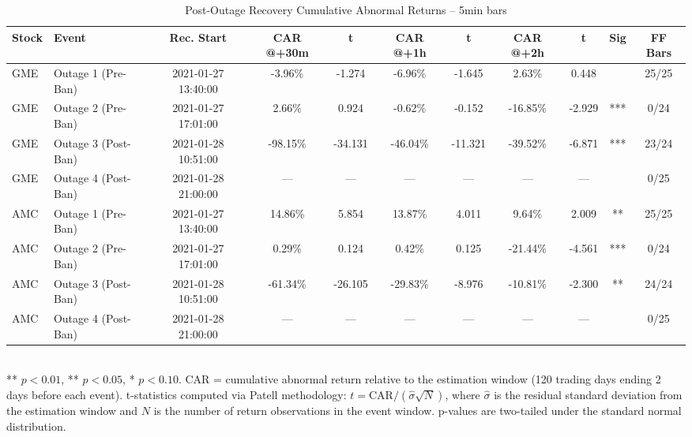 \begin{table}[htbp]
  \centering
  \caption{Post-Outage Recovery Cumulative Abnormal Returns -- 5min bars}
  \label{tab:recovery_5min}
  \begin{tabular}{llccccccccc}
    \hline\hline
    Stock & Event & Rec. Start & CAR @+30m & t & CAR @+1h & t & CAR @+2h & t & Sig & FF Bars \\
    \hline
    GME & Outage 1 (Pre-Ban) & 2021-01-27 13:40:00 & -3.96\% & -1.274 & -6.96\% & -1.645 & 2.63\% & 0.448 &  & 25/25 \\
    GME & Outage 2 (Pre-Ban) & 2021-01-27 17:01:00 & 2.66\% & 0.924 & -0.62\% & -0.152 & -16.85\% & -2.929 & *** & 0/24 \\
    GME & Outage 3 (Post-Ban) & 2021-01-28 10:51:00 & -98.15\% & -34.131 & -46.04\% & -11.321 & -39.52\% & -6.871 & *** & 23/24 \\
    GME & Outage 4 (Post-Ban) & 2021-01-28 21:00:00 & — & — & — & — & — & — &  & 0/25 \\
    \hline
    AMC & Outage 1 (Pre-Ban) & 2021-01-27 13:40:00 & 14.86\% & 5.854 & 13.87\% & 4.011 & 9.64\% & 2.009 & ** & 25/25 \\
    AMC & Outage 2 (Pre-Ban) & 2021-01-27 17:01:00 & 0.29\% & 0.124 & 0.42\% & 0.125 & -21.44\% & -4.561 & *** & 0/24 \\
    AMC & Outage 3 (Post-Ban) & 2021-01-28 10:51:00 & -61.34\% & -26.105 & -29.83\% & -8.976 & -10.81\% & -2.300 & ** & 24/24 \\
    AMC & Outage 4 (Post-Ban) & 2021-01-28 21:00:00 & — & — & — & — & — & — &  & 0/25 \\
    \hline\hline
  \end{tabular}
  \\[4pt]
  {\small *** $p<0.01$, ** $p<0.05$, * $p<0.10$. CAR = cumulative abnormal return relative to the estimation window (120 trading days ending 2 days before each event). t-statistics computed via Patell methodology: $t = \text{CAR} / (\hat{\sigma} \sqrt{N})$, where $\hat{\sigma}$ is the residual standard deviation from the estimation window and $N$ is the number of return observations in the event window. p-values are two-tailed under the standard normal distribution.}
\end{table}

